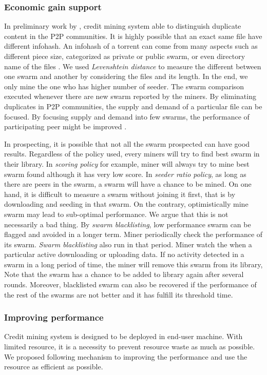 \subsubsection{Economic gain support}
In preliminary work by \citeauthor{2015:creditmining:capota}, credit mining system able to distinguish duplicate content in the P2P communities. It is highly possible that an exact same file have different infohash. An infohash of a torrent can come from many aspects such as different piece size, categorized as private or public swarm, or even directory name of the files \cite{2015:creditmining:capota}. We used \textit{Levenshtein distance} to measure the different between one swarm and another by considering the files and its length. In the end, we only mine the one who has higher number of seeder. The swarm comparison executed whenever there are new swarm reported by the miners. By eliminating duplicates in P2P communities, the supply and demand of a particular file can be focused. By focusing supply and demand into few swarms, the performance of participating peer might be improved .

In prospecting, it is possible that not all the swarm prospected can have good results. Regardless of the policy used, every miners will try to find best swarm in their library. In \textit{scoring policy} for example, miner will always try to mine best swarm found although it has very low score. In \textit{seeder ratio policy}, as long as there are peers in the swarm, a swarm will have a chance to be mined. On one hand, it is difficult to measure a swarm without joining it first, that is by downloading and seeding in that swarm. On the contrary, optimistically mine swarm may lead to sub-optimal performance. We argue that this is not necessarily a bad thing. By \textit{swarm blacklisting}, low performance swarm can be flagged and avoided in a longer term. Miner periodically check the performance of its swarm. \textit{Swarm blacklisting} also run in that period. Miner watch the when a particular active downloading or uploading data. If no activity detected in a swarm in a long period of time, the miner will remove this swarm from its library, Note that the swarm has a chance to be added to library again after several rounds. Moreover, blacklisted swarm can also be recovered if the performance of the rest of the swarms are not better and it has fulfill its threshold time. 

\subsubsection{Improving performance}
Credit mining system is designed to be deployed in end-user machine. With limited resource, it is a necessity to prevent resource waste as much as possible. We proposed following mechanism to improving the performance and use the resource as efficient as possible. 

